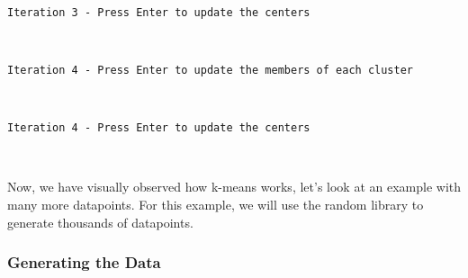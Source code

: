 \documentclass[11pt]{article}
\begin{document}
    \begin{center}
    \end{center}
    { \hspace*{\fill} \\}
    
    \begin{Verbatim}[commandchars=\\\{\}]
Iteration 3 - Press Enter to update the centers
    \end{Verbatim}

    \begin{center}
    \end{center}
    { \hspace*{\fill} \\}
    
    \begin{Verbatim}[commandchars=\\\{\}]
Iteration 4 - Press Enter to update the members of each cluster
    \end{Verbatim}

    \begin{center}
    \end{center}
    { \hspace*{\fill} \\}
    
    \begin{Verbatim}[commandchars=\\\{\}]
Iteration 4 - Press Enter to update the centers
    \end{Verbatim}

    \begin{center}
    \end{center}
    { \hspace*{\fill} \\}
    
    Now, we have visually observed how k-means works, let's look at an
example with many more datapoints. For this example, we will use the
random library to generate thousands of datapoints.

    \hypertarget{generating-the-data}{%
\subsubsection{Generating the Data}\label{generating-the-data}}
\end{document}
